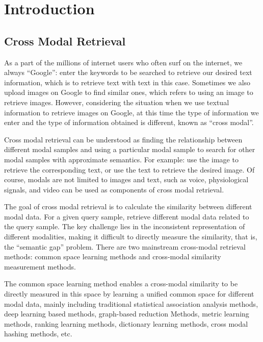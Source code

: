 \chapter{Introduction}
\label{cha:intro}



\section{Cross Modal Retrieval}

As a part of the millions of internet users who often surf on the internet, we always ``Google'': enter the keywords to be searched to retrieve our desired text information, which is to retrieve text with text in this case. Sometimes we also upload images on Google to find similar ones, which refers to using an image to retrieve images. However, considering the situation when we use textual information to retrieve images on Google, at this time the type of information we enter and the type of information obtained is different, known as ``cross modal''.

Cross modal retrieval can be understood as finding the relationship between different modal samples and using a particular modal sample to search for other modal samples with approximate semantics. For example: use the image to retrieve the corresponding text, or use the text to retrieve the desired image. Of course, modals are not limited to images and text, such as voice, physiological signals, and video can be used as components of cross modal retrieval.

The goal of cross modal retrieval is to calculate the similarity between different modal data. For a given query sample, retrieve different modal data related to the query sample. The key challenge lies in the inconsistent representation of different modalities, making it difficult to directly measure the similarity, that is, the ``semantic gap'' problem. There are two mainstream cross-modal retrieval methods: common space learning methods and cross-modal similarity measurement methods.

The common space learning method enables a cross-modal similarity to be directly measured in this space by learning a unified common space for different modal data, mainly including traditional statistical association analysis methods, deep learning based methods, graph-based reduction Methods, metric learning methods, ranking learning methods, dictionary learning methods, cross modal hashing methods, etc.

